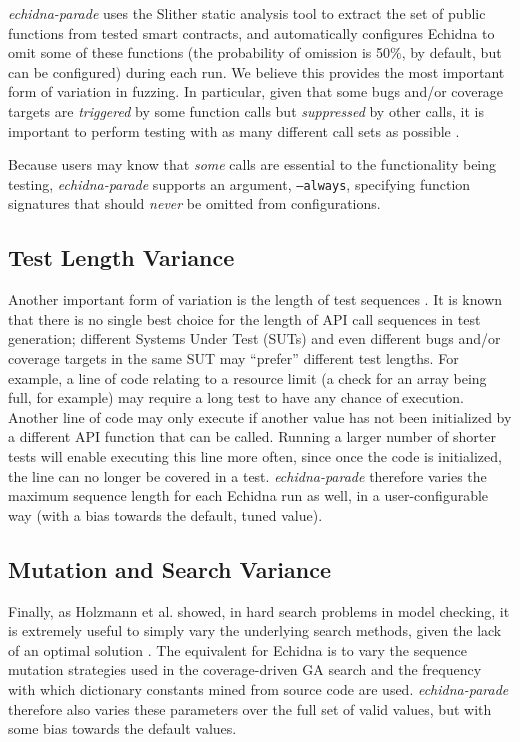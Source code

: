 \documentclass[sigconf,screen]{acmart}
\begin{document}
{\emph{echidna-parade} uses the Slither static analysis tool to extract
the set of public functions from tested smart contracts, and
automatically configures Echidna to omit some of these functions
(the probability of omission is 50\%, by default, but can be configured)
during each run.  We believe this provides the most important form of variation
in fuzzing.  In particular, given that some bugs and/or coverage
targets are \emph{triggered} by some function calls but
\emph{suppressed} by other calls, it is important to perform testing
with as many different call sets as possible \cite{groce2013help}.

Because users may know that \emph{some} calls are essential to the functionality being testing, \emph{echidna-parade} supports an argument, {\tt --always}, specifying function signatures that should \emph{never} be omitted from configurations.

\subsection{Test Length Variance}

Another important form of variation is the length of test sequences \cite{ASE08,ArcuriLen}.  It is
known that there is no single best choice for the length of API call
sequences in test generation; different Systems Under Test  (SUTs) and even different bugs
and/or coverage targets in the same SUT may ``prefer'' different test
lengths.  For example, a line of code relating to a resource limit (a
check for an array being full, for example) may require a long test to
have any chance of execution.  Another line of code may only execute
if another value has not been initialized by a different API function
that can be called.  Running a larger number of shorter tests will enable executing
this line more often, since once the code is initialized, the line can
no longer be covered in a test.  \emph{echidna-parade} therefore
varies the maximum sequence length for each Echidna run as well, in a
user-configurable way (with a bias towards the default, tuned value).

\subsection{Mutation and Search Variance}

Finally, as Holzmann et al. showed, in hard search problems in model
checking, it is extremely useful to simply vary the underlying search
methods, given the lack of an optimal solution \cite{swarmIEEE}.  The
equivalent for Echidna is to vary the sequence mutation strategies
used in the coverage-driven GA search and the frequency with which
dictionary constants mined from source code are used.
\emph{echidna-parade} therefore also varies these parameters over the
full set of valid values, but with some bias towards the default values.

}
\end{document}
